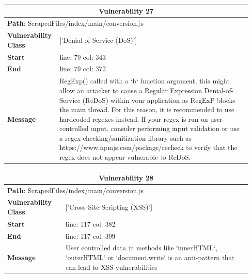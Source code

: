 \documentclass[12pt]{article}
\begin{document}
\vspace{0.7cm}
\FloatBarrier
\begin{table}[!h]
\centering
\renewcommand{\arraystretch}{1.3}
\begin{tabular}{|l|p{10cm}|}
\hline
\multicolumn{2}{|c|}{\textbf{Vulnerability 27}} \\
\hline
\multicolumn{2}{|l|}{\textbf{Path}: ScrapedFiles/index/main/conversion.js} \\
\hline
\textbf{Vulnerability Class} & ['Denial-of-Service (DoS)'] \\
\hline
\textbf{Start} & line: 79 \quad col: 343 \\
\hline
\textbf{End} & line: 79 \quad col: 372 \\
\hline
\textbf{Message} & RegExp() called with a `b` function argument, this might allow an attacker to cause a Regular Expression Denial-of-Service (ReDoS) within your application as RegExP blocks the main thread. For this reason, it is recommended to use hardcoded regexes instead. If your regex is run on user-controlled input, consider performing input validation or use a regex checking/sanitization library such as https://www.npmjs.com/package/recheck to verify that the regex does not appear vulnerable to ReDoS. \\
\hline
\end{tabular}
\end{table}
\vspace{0.7cm}
\FloatBarrier
\begin{table}[!h]
\centering
\renewcommand{\arraystretch}{1.3}
\begin{tabular}{|l|p{10cm}|}
\hline
\multicolumn{2}{|c|}{\textbf{Vulnerability 28}} \\
\hline
\multicolumn{2}{|l|}{\textbf{Path}: ScrapedFiles/index/main/conversion.js} \\
\hline
\textbf{Vulnerability Class} & ['Cross-Site-Scripting (XSS)'] \\
\hline
\textbf{Start} & line: 117 \quad col: 382 \\
\hline
\textbf{End} & line: 117 \quad col: 399 \\
\hline
\textbf{Message} & User controlled data in methods like `innerHTML`, `outerHTML` or `document.write` is an anti-pattern that can lead to XSS vulnerabilities \\
\hline
\end{tabular}
\end{table}
\vspace{0.7cm}
\FloatBarrier
\end{document}
